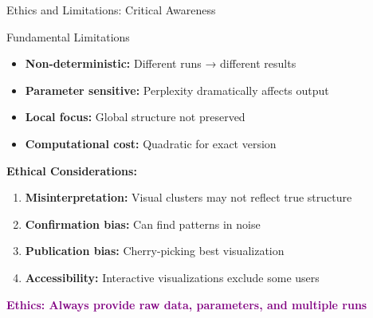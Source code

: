 \documentclass[aspectratio=169]{beamer}
\newcommand{\conceptbox}[2]{\colorbox{#1!20}{\textcolor{#1}{\textbf{#2}}}}
\newcommand{\ethics}[1]{\conceptbox{purple}{Ethics: #1}}
\begin{document}
\begin{frame}{Ethics and Limitations: Critical Awareness}
\begin{block}{Fundamental Limitations}
\begin{itemize}
\item \textbf{Non-deterministic:} Different runs → different results
\item \textbf{Parameter sensitive:} Perplexity dramatically affects output
\item \textbf{Local focus:} Global structure not preserved
\item \textbf{Computational cost:} Quadratic for exact version
\end{itemize}
\end{block}

\textbf{Ethical Considerations:}
\begin{enumerate}
\item \textbf{Misinterpretation:} Visual clusters may not reflect true structure
\item \textbf{Confirmation bias:} Can find patterns in noise
\item \textbf{Publication bias:} Cherry-picking best visualization
\item \textbf{Accessibility:} Interactive visualizations exclude some users
\end{enumerate}

\ethics{Always provide raw data, parameters, and multiple runs}
\end{frame}
\end{document}
